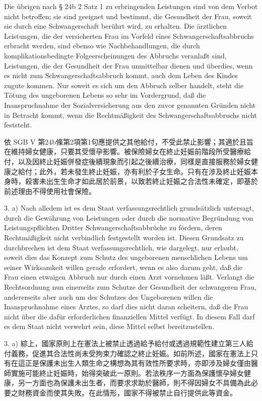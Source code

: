 \documentclass[12pt]{article}
\begin{document}
\begin{sourcepara}[title={原文E.218}]
Die übrigen nach § 24b \abbrAbs{} 2 Satz 1 \abbrSGBV{} zu erbringenden Leistungen sind von dem Verbot nicht betroffen; sie sind geeignet und bestimmt, die Gesundheit der Frau, soweit sie durch eine Schwangerschaft berührt wird, zu erhalten. Die ärztlichen Leistungen, die der versicherten Frau im Vorfeld eines Schwangerschaftsabbruchs erbracht werden, sind ebenso wie Nachbehandlungen, die durch komplikationsbedingte Folgeerscheinungen des Abbruchs veranlaßt sind, Leistungen, die der Gesundheit der Frau unmittelbar dienen und überdies, wenn es nicht zum Schwangerschaftsabbruch kommt, auch dem Leben des Kindes zugute kommen. Nur soweit es sich um den Abbruch selber handelt, steht die Tötung des ungeborenen Lebens so sehr im Vordergrund, daß die Inanspruchnahme der Sozialversicherung aus den zuvor genannten Gründen nicht in Betracht kommt, wenn die Rechtmäßigkeit des Schwangerschaftsabbruchs nicht feststeht.
\end{sourcepara}
\begin{transpara}
依 SGB V 第24b條第2項第1句應提供之其他給付，不受此禁止影響；其適於且旨在維持婦女健康，只要其受懷孕影響。被保險婦女在終止妊娠前階段所受醫療給付，以及因終止妊娠併發症後續現象而引起之後續治療，同樣是直接服務於婦女健康之給付；此外，若未發生終止妊娠，亦有利於子女生命。只有在涉及終止妊娠本身時，殺害未出生生命才如此居於前景，以致若終止妊娠之合法性未確定，即基於前述理由不得使用社會保險。
\end{transpara}

\begin{sourcepara}[title={原文E.219}]
3. a) Nach alledem ist es dem Staat verfassungsrechtlich grundsätzlich untersagt, durch die Gewährung von Leistungen oder durch die normative Begründung von Leistungspflichten Dritter Schwangerschaftsabbrüche zu fördern, deren Rechtmäßigkeit nicht verbindlich festgestellt worden ist. Diesen Grundsatz zu durchbrechen ist dem Staat verfassungsrechtlich, wie dargelegt, nur erlaubt, soweit dies das Konzept zum Schutz des ungeborenen menschlichen Lebens um seiner Wirksamkeit willen gerade erfordert, wenn es also darum geht, daß die Frau einen etwaigen Abbruch nur durch einen Arzt vornehmen läßt. Verlangt die Rechtsordnung nun einerseits zum Schutze der Gesundheit der schwangeren Frau, andererseits aber auch um des Schutzes des Ungeborenen willen die Inanspruchnahme eines Arztes, so darf dies nicht daran scheitern, daß die Frau nicht über die dafür erforderlichen finanziellen Mittel verfügt. In diesem Fall darf es dem Staat nicht verwehrt sein, diese Mittel selbst bereitzustellen.
\end{sourcepara}
\begin{transpara}
3. a) 綜上，國家原則上在憲法上被禁止透過給予給付或透過規範性建立第三人給付義務，促進其合法性尚未受拘束力確認之終止妊娠。如前所述，國家在憲法上只有在這正是保護未出生人類生命之構想為其有效性所要求時，亦即涉及婦女僅由醫師實施可能終止妊娠時，始得突破此一原則。若法秩序一方面為保護懷孕婦女健康，另一方面也為保護未出生者，而要求求助於醫師，則不得因婦女不具備為此必要之財務資金而使其失敗。在此情形，國家不得被禁止自行提供此等資金。
\end{transpara}
\end{document}
